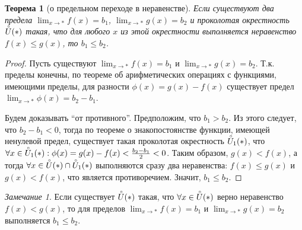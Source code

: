 \documentclass[a4paper,12pt]{article} %
\newtheorem{theorem}{Теорема}[section]
\theoremstyle{remark}
\newtheorem{remark}{Замечание}[theorem]
\theoremstyle{definition}
\begin{document}
\begin{theorem}[о предельном переходе в неравенстве]
	Если существуют два предела $\lim_{x \to *} f(x) = b_1$, $\lim_{x \to *} g(x) = b_2$ и проколотая окрестность 
    $\accentset{\circ}{U}(*)$ такая, что для любого $x$ из этой окрестности выполняется неравенство $f(x) \le g(x)$,
    то $b_1\le b_2$.
\end{theorem}
\begin{proof}
	Пусть существуют $\lim_{x \to *} f(x) = b_1$ и $\lim_{x \to *} g(x) = b_2$. Т.к. пределы конечны, по теореме об арифметических операциях с функциями, имеющими пределы, для разности $\phi(x) = g(x) - f(x)$ существует предел $\lim_{x \to *} \phi(x) = b_2-b_1$.

	Будем доказывать ``от противного''. Предположим, что $b_1>b_2$. Из этого следует, что $b_2-b_1<0$, тогда по теореме о знакопостоянстве функции, имеющей ненулевой предел, существует такая проколотая окрестность $\accentset{\circ}{U}_1(*)$, что $\forall x \in  \accentset{\circ}{U}_1(*) : \phi(x) = g(x) - f(x) < \frac{b_2-b_1}{2} < 0$. Таким образом, $g(x) < f(x)$, а тогда $\forall x \in  \accentset{\circ}{U}(*) \cap \accentset{\circ}{U}_1(*)$ выполняются сразу два неравенства: $f(x) \le  g(x)$ и $g(x) < f(x)$, что является противоречием. Значит, $b_1\le b_2$.
\end{proof}

\begin{remark}
	Если существует $\accentset{\circ}{U}(*)$ такая, что $\forall x \in  \accentset{\circ}{U}(*)$ верно неравенство 
    $f(x) < g(x)$, то для пределов $\displaystyle \lim_{x \to *} f(x) = b_1$ и $\displaystyle \lim_{x \to *} g(x) = b_2$
    выполняется $b_1\le b_2$.
\end{remark}
\end{document}
